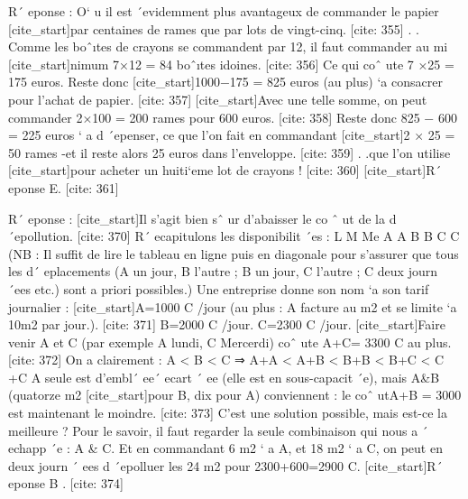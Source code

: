 R´ eponse : O` u il est ´evidemment plus avantageux de commander le papier 
 [cite_start]par centaines de rames que par lots de vingt-cinq. [cite: 355]
. .
 Comme les boˆıtes de crayons se commandent par 12, il faut commander au mi 
 [cite_start]nimum 7×12 = 84 boˆıtes idoines. [cite: 356]
Ce qui coˆ ute 7 ×25 = 175 euros. Reste donc
 [cite_start]1000−175 = 825 euros (au plus) `a consacrer pour l’achat de papier. [cite: 357]
[cite_start]Avec une telle somme, on peut commander 2×100 = 200 rames pour 600 euros. [cite: 358]
Reste donc 825 − 600 = 225 euros ` a d ´epenser, ce que l’on fait en commandant 
 [cite_start]2 × 25 = 50 rames -et il reste alors 25 euros dans l’enveloppe. [cite: 359]
. .que l’on utilise
 [cite_start]pour acheter un huiti`eme lot de crayons ! [cite: 360]
[cite_start]R´ eponse E. [cite: 361]

R´ eponse :
 [cite_start]Il s’agit bien sˆ ur d’abaisser le co ˆ ut de la d ´epollution. [cite: 370]
R´ ecapitulons les disponibilit ´es : 
 L M Me
 A A
 B B
 C C
 (NB : Il suffit de lire le tableau en ligne puis en diagonale pour s’assurer que tous
 les d´ eplacements (A un jour, B l’autre ; B un jour, C l’autre ; C deux journ ´ees etc.) 
 sont a priori possibles.)
 Une entreprise donne son nom `a son tarif journalier : 
 [cite_start]A=1000 C /jour (au plus : A facture au m2 et se limite `a 10m2 par jour.). [cite: 371]
B=2000 C /jour.
 C=2300 C /jour.
 [cite_start]Faire venir A et C (par exemple A lundi, C Mercerdi) coˆ ute A+C= 3300 C au plus. [cite: 372]
On a clairement :
 A < B < C ⇒ A+A < A+B < B+B < B+C < C +C
 A seule est d’embl´ ee´ ecart ´ ee (elle est en sous-capacit ´e), mais A&B (quatorze m2 
 [cite_start]pour B, dix pour A) conviennent : le coˆ utA+B = 3000 est maintenant le moindre. [cite: 373]
C’est une solution possible, mais est-ce la meilleure ?
 Pour le savoir, il faut regarder la seule combinaison qui nous a ´ echapp ´e : A & C. 
 Et en commandant 6 m2 ` a A, et 18 m2 ` a C, on peut en deux journ ´ ees d ´epolluer 
 les 24 m2 pour 2300+600=2900 C.
 [cite_start]R´ eponse B . [cite: 374]

